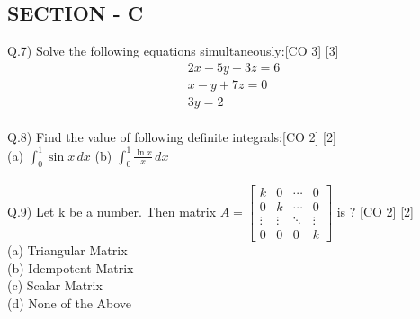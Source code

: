 \documentclass[12pt]{article}
\begin{document}
\newpage

\subsection{SECTION - C} 
\vspace{2mm}
Q.7) Solve the following equations simultaneously:\hfill [CO 3] [3]
\begin{align*}
2x - 5 y + 3z = 6\\
x - y + 7z = 0\\
3y = 2
\end{align*}\\

Q.8) Find the value of following definite integrals:\hfill [CO 2] [2]\\

(a) \( \int_{0}^{1} \sin x \, dx \) \hspace{15mm} (b) \( \int_{0}^{1} \frac{\ln x}{x} \, dx \)\\\\

Q.9) Let k be a number. Then matrix $A = \begin{bmatrix}
k & 0 & \cdots & 0\\
0 & k & \cdots & 0\\
\vdots & \vdots & \ddots & \vdots\\
0 & 0 & 0 & k
\end{bmatrix}$ is ? \hfill [CO 2] [2]\\
\indent(a) Triangular Matrix\\
\indent(b) Idempotent Matrix\\
\indent(c) Scalar Matrix\\
\indent(d) None of the Above
\end{document}
